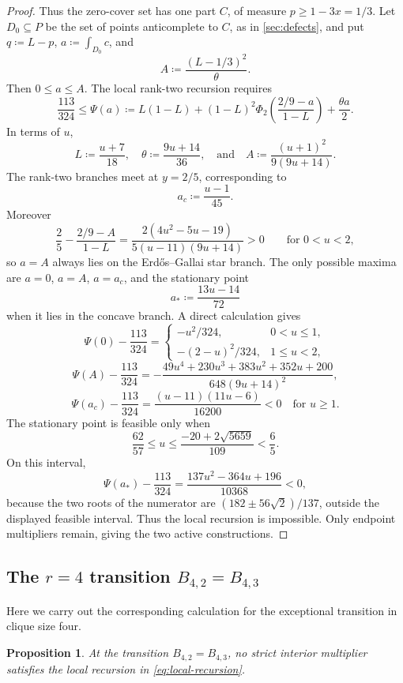 \documentclass[10pt]{article}
\numberwithin{equation}{section}
\newtheorem{proposition}[proposition]{Proposition}
\begin{document}
\begin{proof}
Thus the zero-cover set has one part $C$, of measure $p\ge1-3x=1/3$.  Let $D_0\subseteq P$ be the set of points anticomplete to $C$, as in \cref{sec:defects}, and put $q\coloneqq L-p$, $a\coloneqq\int_{D_0}c$, and
\[
 A\coloneqq\frac{(L-1/3)^2}{\theta}.
\]
Then $0\le a\le A$.
The local rank-two recursion requires
\[
 \frac{113}{324}
 \le
 \Psi(a)
 \coloneqq
 L(1-L)+(1-L)^2\Phi_2\left(\frac{2/9-a}{1-L}\right)+\frac{\theta a}{2}.
\]
In terms of $u$,
\[
 L\coloneqq\frac{u+7}{18},
 \quad
 \theta\coloneqq\frac{9u+14}{36},
 \quad\text{and}\quad
 A\coloneqq\frac{(u+1)^2}{9(9u+14)}.
\]
The rank-two branches meet at $y=2/5$, corresponding to
\[
 a_c\coloneqq\frac{u-1}{45}.
\]
Moreover
\[
 \frac25-\frac{2/9-A}{1-L}
 =\frac{2(4u^2-5u-19)}{5(u-11)(9u+14)}>0
 \qquad\text{for }0<u<2,
\]
so $a=A$ always lies on the Erd\H{o}s--Gallai star branch.  The only possible maxima are $a=0$, $a=A$, $a=a_c$, and the stationary point
\[
 a_*\coloneqq\frac{13u-14}{72}
\]
when it lies in the concave branch.  A direct calculation gives
\[
 \Psi(0)-\frac{113}{324}
 =\begin{cases}
 -u^2/324,&0<u\le1,\\
 -(2-u)^2/324,&1\le u<2,
 \end{cases}
\]
\[
 \Psi(A)-\frac{113}{324}
 =-
 \frac{49u^4+230u^3+383u^2+352u+200}
 {648(9u+14)^2},
\]
\[
 \Psi(a_c)-\frac{113}{324}
 =\frac{(u-11)(11u-6)}{16200}<0
 \quad\text{for }u\ge1.
\]
The stationary point is feasible only when
\[
 \frac{62}{57}\le u\le
 \frac{-20+2\sqrt{5659}}{109}<\frac65.
\]
On this interval,
\[
 \Psi(a_*)-\frac{113}{324}
 =\frac{137u^2-364u+196}{10368}<0,
\]
because the two roots of the numerator are $(182\pm56\sqrt2)/137$, outside the displayed feasible interval.  Thus the local recursion is impossible.  Only endpoint multipliers remain, giving the two active constructions.
\end{proof}

\subsection{The \texorpdfstring{$r=4$ transition $B_{4,2}=B_{4,3}$}
{r = 4 transition B(4,2) = B(4,3)}}\label{app:r4-transition}

Here we carry out the corresponding calculation for the exceptional transition in clique size four.

\begin{proposition}\label{prop:r4-transition-estimate}
At the transition $B_{4,2}=B_{4,3}$, no strict interior multiplier satisfies the local recursion in \cref{eq:local-recursion}.
\end{proposition}
\end{document}
